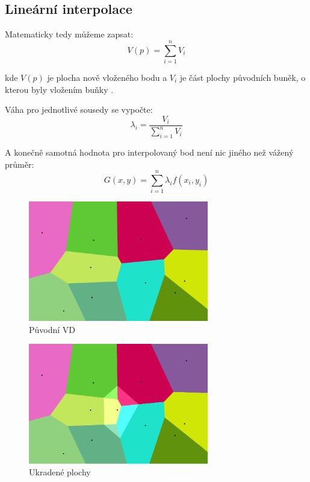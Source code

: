 \documentclass[12pt,a4paper]{article}
\begin{document}
\subsection{Lineární interpolace}
\label{sub:linear}
\bigskip
Matematicky tedy můžeme zapsat:
\newline
$$V(p)=\sum_{i=1}^n V_i$$

\noindent kde $V(p)$ je plocha nově vloženého bodu a $V_i$ je část
plochy původních buněk, o kterou byly vložením buňky .

\bigskip
\noindent Váha pro jednotlivé sousedy se vypočte:
\newline
$$\lambda_i = \frac{V_i}{\sum_{i=1}^n V_i}$$

\bigskip
\noindent A konečně samotná hodnota pro interpolovaný bod není nic jiného než vážený průměr:
\newline
$$G(x,y) = \sum_{i=1}^{n} \lambda_i  f(x_i, y_i)$$

\newpage
\begin{figure}[h!]
\centering
\includegraphics[width=0.7\textwidth]{img/canvas_0.png}
\caption{Původní VD}
\label{fig:fig:canvas0}
\end{figure}

\begin{figure}[h!]
\centering
\includegraphics[width=0.7\textwidth]{img/canvas_1.png}
\caption{Ukradené plochy}
\label{fig:fig:canvas1}
\end{figure}
\end{document}
